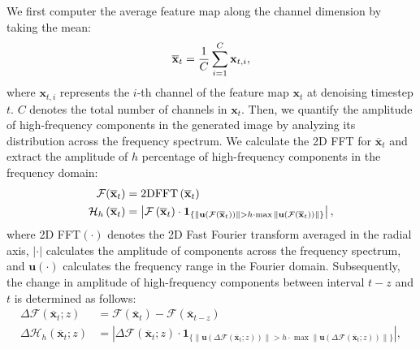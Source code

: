 We first computer the average feature map along the channel dimension by taking the mean:
\vspace{-3pt}
\begin{equation}
\vspace{-1pt}
    \overline{\mathbf{x}}_{t}=\frac{1}{C}\sum\limits^{C}_{i=1}\mathbf{x}_{t,i},
\end{equation}
where $\mathbf{x}_{t,i}$ represents the $i$-th channel of the feature map $\mathbf{x}_{t}$ at denoising timestep $t$. $C$ denotes the total number of channels in $\mathbf{x}_{t}$. Then, we quantify the amplitude of high-frequency components in the generated image by analyzing its distribution across the frequency spectrum. We calculate the 2D FFT for $\overline{\mathbf{x}}_{t}$ and extract the amplitude of $h$ percentage of high-frequency components in the frequency domain:
\vspace{-3pt}
\begin{equation}
\vspace{-1pt}
\begin{aligned}
\label{eq:3}
\mathcal{F}(\overline{\mathbf{x}}_{t}) &= \text{2DFFT}\left(\overline{\mathbf{x}}_{t}\right) \\
\mathcal{H}_{h}\left(\overline{\mathbf{x}}_{t}\right) &= \left|\mathcal{F}\left(\overline{\mathbf{x}}_{t}\right) \cdot \mathbf{1}_{\{\|\mathbf{u}\left(\mathcal{F}\left(\overline{\mathbf{x}}_{t}\right)\right)\| > h \cdot \max \|\mathbf{u}\left(\mathcal{F}\left(\overline{\mathbf{x}}_{t}\right)\right)\|\}}\right|,
\end{aligned}
\end{equation}
where 2D FFT$(\cdot)$ denotes the 2D Fast Fourier transform averaged in the radial axis, $|\cdot|$ calculates the amplitude of components across the frequency spectrum, and $\mathbf{u}(\cdot)$ calculates the frequency range in the Fourier domain. Subsequently, the change in amplitude of high-frequency components between interval $t-z$ and $t$ is determined as follows:
\begin{equation}
\begin{aligned}
\label{eq:4}
\Delta\mathcal{F}\left(\overline{\mathbf{x}}_{t};z\right)&= \mathcal{F}\left(\overline{\mathbf{x}}_{t}\right)-\mathcal{F}\left(\overline{\mathbf{x}}_{t-z}\right) \\
\Delta\mathcal{H}_{h}\left(\overline{\mathbf{x}}_{t};z\right) &= \left|\Delta\mathcal{F}\left(\overline{\mathbf{x}}_{t};z\right) \cdot \mathbf{1}_{\{\|\mathbf{u}\left(\Delta\mathcal{F}\left(\overline{\mathbf{x}}_{t};z\right)\right)\| > h \cdot \max \|\mathbf{u}\left(\Delta\mathcal{F}\left(\overline{\mathbf{x}}_{t};z\right)\right)\|\}}\right|,
\end{aligned}
\end{equation}
